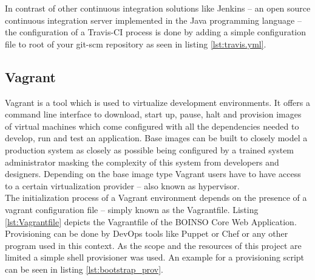 \documentclass[BachelorPaper]{subfiles}
\begin{document}
In contrast of other continuous integration solutions like Jenkins -- an open source continuous integration server implemented in the Java programming language -- the configuration of a Travis-CI process is done by adding a simple configuration file to root of your \ac{git-scm} repository as seen in listing \ref{lst:travis.yml}.\\



\subsection{Vagrant}
Vagrant is a tool which is used to virtualize development environments. It offers a command line interface to download, start up, pause, halt and provision images of virtual machines which come configured with all the dependencies needed to develop, run and test an application. Base images can be built to closely model a production system as closely as possible being configured by a trained system administrator masking the complexity of this system from developers and designers. Depending on the base image type Vagrant users have to have access to a certain virtualization provider -- also known as hypervisor.\\

The initialization process of a Vagrant environment depends on the presence of a vagrant configuration file -- simply known as the Vagrantfile. Listing \ref{lst:Vagrantfile} depicts the Vagrantfile of the BOINSO Core Web Application.\\



Provisioning can be done by DevOps tools like Puppet or Chef or any other program used in this context. As the scope and the resources of this project are limited a simple shell provisioner was used. An example for a provisioning script can be seen in listing \ref{lst:bootstrap_prov}.\\
\end{document}
